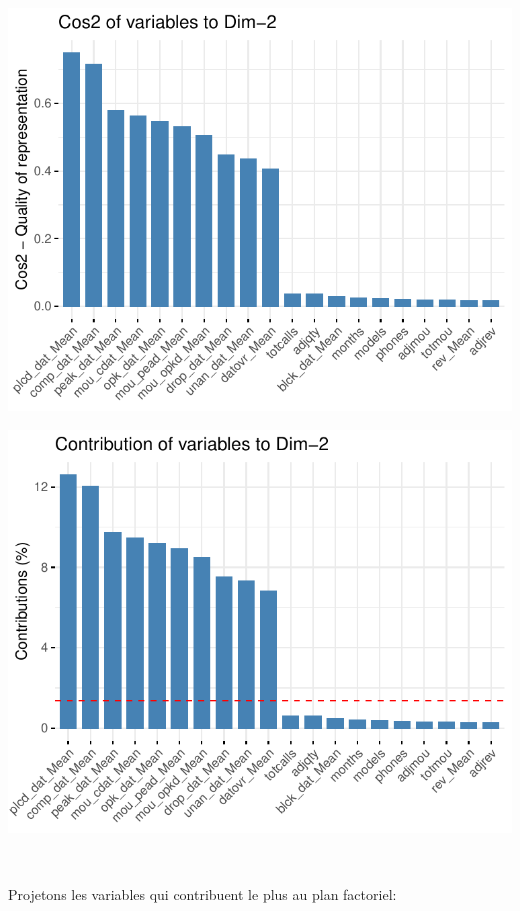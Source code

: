 \documentclass[]{imsart}
\numberwithin{equation}{section}
\theoremstyle{plain}
\begin{document}
\begin{flushleft}\includegraphics{Analyse_Exploratoire_Projet_files/figure-latex/unnamed-chunk-15-3} \end{flushleft}

\begin{flushleft}\includegraphics{Analyse_Exploratoire_Projet_files/figure-latex/unnamed-chunk-15-4} \end{flushleft}

~

Projetons les variables qui contribuent le plus au plan factoriel:
\end{document}

